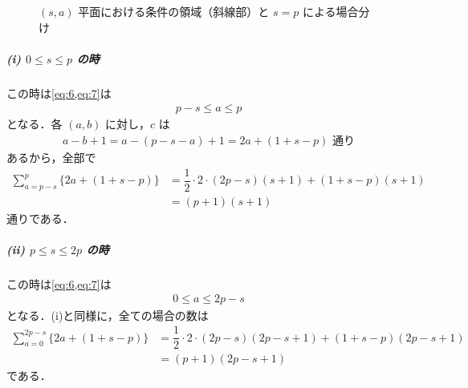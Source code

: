 \documentclass[../../main.tex]{subfiles}
\begin{document}
\begin{figure}[htb]
  \caption{$(s, a)$ 平面における条件の領域（斜線部）と $s = p$ による場合分け}
  \label{fig:sa_plane_cases_sketch}
\end{figure}

\subparagraph{(i) $0 \le s \le p$ の時}

この時は\cref{eq:6,eq:7}は
\begin{align}
  p-s \le a \le p
\end{align}
となる．各 $(a,b)$ に対し，$c$ は
\begin{align}
  a - b + 1 = a - (p-s-a) + 1 = 2a + (1+s-p) \text{ 通り}
\end{align}
あるから，全部で
\begin{align}
  \sum_{a=p-s}^{p} \{ 2a + (1+s-p) \}
  &= \dfrac{1}{2} \cdot 2 \cdot (2p-s)(s+1) + (1+s-p)(s+1) \\
  &= (p+1)(s+1) \label{eq:8}
\end{align}
通りである．

\subparagraph{(ii) $p \le s \le 2p$ の時}

この時は\cref{eq:6,eq:7}は
\begin{align}
  0 \le a \le 2p-s
\end{align}
となる．(i)と同様に，全ての場合の数は
\begin{align}
  \sum_{a=0}^{2p-s} \{ 2a + (1+s-p) \}
  &= \dfrac{1}{2} \cdot 2 \cdot (2p-s)(2p-s+1) + (1+s-p)(2p-s+1) \\
  &= (p+1)(2p-s+1) \label{eq:9}
\end{align}
である．
\casesend
\end{document}
